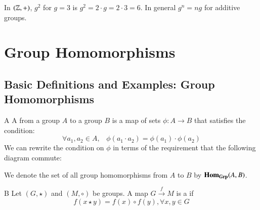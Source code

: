 \documentclass[12pt, a4paper, twoside, openright, titlepage]{book}
\begin{document}
\begin{eg}{}{}
    In $(\mathbb Z,+)$, $g^2$ for $g = 3$ is $g^2 = 2\cdot g = 2\cdot 3 = 6$. In general $g^n = ng$ for additive groups.
\end{eg}




\chapter{\textsection\textsection Group Homomorphisms}

\section{\textsection Basic Definitions and Examples: Group Homomorphisms}

\begin{defn}{A}{}
    A  from a group $A$ to a group $B$ is a map of sets $\phi:A\rightarrow B$ that satisfies the condition: \begin{equation}
        \forall a_1,a_2\in A,\;\;\;\phi(a_1\cdot a_2) = \phi(a_1)\cdot \phi(a_2)
    \end{equation}
    We can rewrite the condition on $\phi$ in terms of the requirement that the following diagram commute: \begin{center}
        \end{center}
        We denote the set of all group homomorphisms from $A$ to $B$ by $\mathbf{Hom}_{\normalfont\textbf{Grp}}(A,B)$.
\end{defn}


\begin{defn}{B}{}
    Let $(G,\star)$ and $(M,\circ)$ be groups. A map $G\xrightarrow{f} M$ is a  if \begin{equation}
        f(x\star y) = f(x)\circ f(y),\forall x,y \in G
    \end{equation} 
\end{defn}
\end{document}
